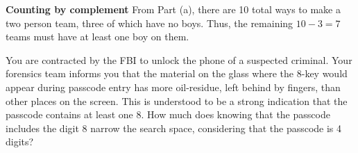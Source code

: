 \documentclass[]{exam}
\begin{document}
\begin{questions}
\begin{parts}
\begin{solution}
            \textbf{Counting by complement} From Part (a), there are 10 total
            ways to make a two person team, three of which have no boys. Thus,
            the remaining $10-3=7$ teams must have at least one boy on them.
          \end{solution}
      \end{parts}

    \newpage


    \question You are contracted by the FBI to unlock the phone of a suspected
      criminal. Your forensics team informs you that the material on the glass
      where the 8-key would appear during passcode entry has more oil-residue,
      left behind by fingers, than other places on the screen. This is
      understood to be a strong indication that the passcode contains at least
      one 8. How much does knowing that the passcode includes the digit 8 narrow
      the search space, considering that the passcode is 4 digits?

\end{questions}
\end{document}

